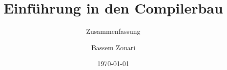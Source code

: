 \documentclass[
    ngerman,
    color=1b,
    loadcommon, %
    summary,
    boxarc,
    main,
]{rubos-tuda-template}
\title[EICB]{Einführung in den Compilerbau}
\subtitle{Zusammenfassung}
\author{Bassem Zouari}
\date{\today}
\begin{document}
\maketitle{}
\tableofcontents %
\clearpage

%    
%

\clearpage

\clearpage

\end{document}
